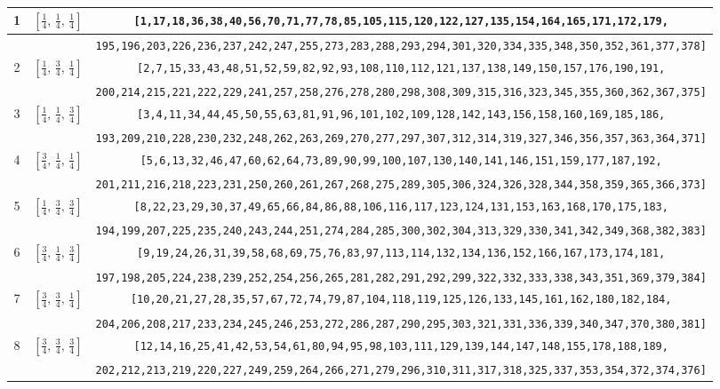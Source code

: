 \documentclass[fleqn,8pt]{jsarticle}
\begin{document}
\begin{longtable}{ccc}
1 & $\left[ \frac{1}{4},\, \frac{1}{4},\, \frac{1}{4} \right]$ & {\tt [1,17,18,36,38,40,56,70,71,77,78,85,105,115,120,122,127,135,154,164,165,171,172,179,} \\ \hline
 &  & {\tt 195,196,203,226,236,237,242,247,255,273,283,288,293,294,301,320,334,335,348,350,352,361,377,378]} \\ \hline
2 & $\left[ \frac{1}{4},\, \frac{3}{4},\, \frac{1}{4} \right]$ & {\tt [2,7,15,33,43,48,51,52,59,82,92,93,108,110,112,121,137,138,149,150,157,176,190,191,} \\ \hline
 &  & {\tt 200,214,215,221,222,229,241,257,258,276,278,280,298,308,309,315,316,323,345,355,360,362,367,375]} \\ \hline
3 & $\left[ \frac{1}{4},\, \frac{1}{4},\, \frac{3}{4} \right]$ & {\tt [3,4,11,34,44,45,50,55,63,81,91,96,101,102,109,128,142,143,156,158,160,169,185,186,} \\ \hline
 &  & {\tt 193,209,210,228,230,232,248,262,263,269,270,277,297,307,312,314,319,327,346,356,357,363,364,371]} \\ \hline
4 & $\left[ \frac{3}{4},\, \frac{1}{4},\, \frac{1}{4} \right]$ & {\tt [5,6,13,32,46,47,60,62,64,73,89,90,99,100,107,130,140,141,146,151,159,177,187,192,} \\ \hline
 &  & {\tt 201,211,216,218,223,231,250,260,261,267,268,275,289,305,306,324,326,328,344,358,359,365,366,373]} \\ \hline
5 & $\left[ \frac{1}{4},\, \frac{3}{4},\, \frac{3}{4} \right]$ & {\tt [8,22,23,29,30,37,49,65,66,84,86,88,106,116,117,123,124,131,153,163,168,170,175,183,} \\ \hline
 &  & {\tt 194,199,207,225,235,240,243,244,251,274,284,285,300,302,304,313,329,330,341,342,349,368,382,383]} \\ \hline
6 & $\left[ \frac{3}{4},\, \frac{1}{4},\, \frac{3}{4} \right]$ & {\tt [9,19,24,26,31,39,58,68,69,75,76,83,97,113,114,132,134,136,152,166,167,173,174,181,} \\ \hline
 &  & {\tt 197,198,205,224,238,239,252,254,256,265,281,282,291,292,299,322,332,333,338,343,351,369,379,384]} \\ \hline
7 & $\left[ \frac{3}{4},\, \frac{3}{4},\, \frac{1}{4} \right]$ & {\tt [10,20,21,27,28,35,57,67,72,74,79,87,104,118,119,125,126,133,145,161,162,180,182,184,} \\ \hline
 &  & {\tt 204,206,208,217,233,234,245,246,253,272,286,287,290,295,303,321,331,336,339,340,347,370,380,381]} \\ \hline
8 & $\left[ \frac{3}{4},\, \frac{3}{4},\, \frac{3}{4} \right]$ & {\tt [12,14,16,25,41,42,53,54,61,80,94,95,98,103,111,129,139,144,147,148,155,178,188,189,} \\ \hline
 &  & {\tt 202,212,213,219,220,227,249,259,264,266,271,279,296,310,311,317,318,325,337,353,354,372,374,376]} \\
\end{longtable}
\end{document}
